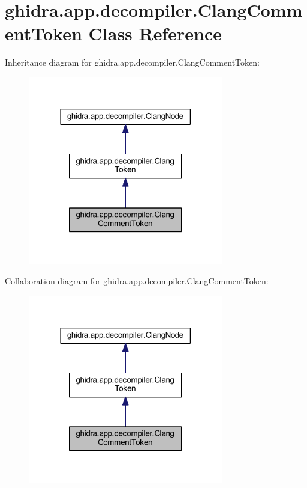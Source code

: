 \hypertarget{classghidra_1_1app_1_1decompiler_1_1_clang_comment_token}{}\section{ghidra.\+app.\+decompiler.\+Clang\+Comment\+Token Class Reference}
\label{classghidra_1_1app_1_1decompiler_1_1_clang_comment_token}


Inheritance diagram for ghidra.\+app.\+decompiler.\+Clang\+Comment\+Token\+:
\nopagebreak
\begin{figure}[H]
\begin{center}
\leavevmode
\includegraphics[width=242pt]{classghidra_1_1app_1_1decompiler_1_1_clang_comment_token__inherit__graph}
\end{center}
\end{figure}


Collaboration diagram for ghidra.\+app.\+decompiler.\+Clang\+Comment\+Token\+:
\nopagebreak
\begin{figure}[H]
\begin{center}
\leavevmode
\includegraphics[width=242pt]{classghidra_1_1app_1_1decompiler_1_1_clang_comment_token__coll__graph}
\end{center}
\end{figure}
